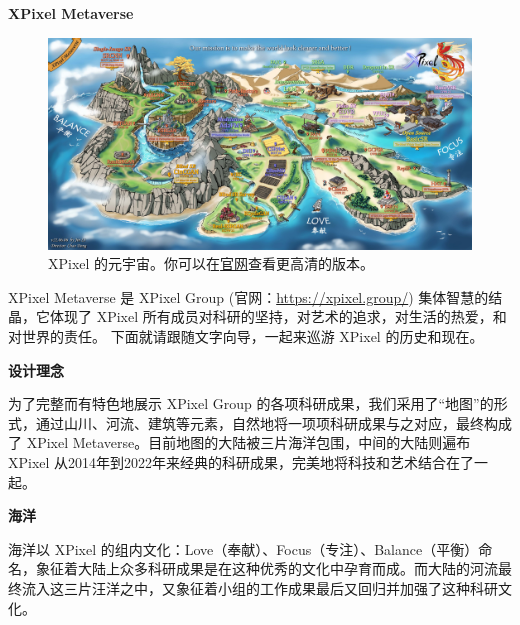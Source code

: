 \documentclass[../main.tex]{subfiles}
\begin{document}
\newpage
{\LARGE\textbf{ XPixel Metaverse}}

\begin{figure}[h]
    \vspace{1cm}
    \begin{center}
        \includegraphics[width=\linewidth]{figures/XPixelMetaverse_small.jpg}
        \vspace{-0.7cm}
        \caption{XPixel 的元宇宙。你可以在\href{https://xpixel.group/2022/06/06/poster.html}{官网}查看更高清的版本。}
    \end{center}
\end{figure}

XPixel Metaverse 是 XPixel Group (官网：\url{https://xpixel.group/}) 集体智慧的结晶，它体现了 XPixel 所有成员对科研的坚持，对艺术的追求，对生活的热爱，和对世界的责任。
下面就请跟随文字向导，一起来巡游 XPixel 的历史和现在。

{\large\textbf{设计理念}}

为了完整而有特色地展示 XPixel Group 的各项科研成果，我们采用了“地图”的形式，通过山川、河流、建筑等元素，自然地将一项项科研成果与之对应，最终构成了 XPixel Metaverse。目前地图的大陆被三片海洋包围，中间的大陆则遍布 XPixel 从2014年到2022年来经典的科研成果，完美地将科技和艺术结合在了一起。

\textbf{海洋}

海洋以 XPixel 的组内文化：Love（奉献）、Focus（专注）、Balance（平衡）命名，象征着大陆上众多科研成果是在这种优秀的文化中孕育而成。而大陆的河流最终流入这三片汪洋之中，又象征着小组的工作成果最后又回归并加强了这种科研文化。
\end{document}
